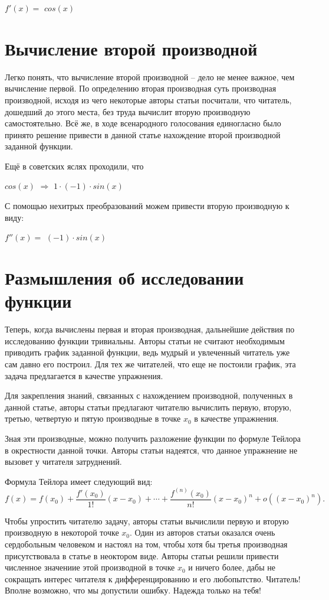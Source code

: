 \documentclass{article}
\begin{document}
$f'(x) = $ $ cos (x)$

\section{Вычисление второй производной}

Легко понять, что вычисление второй производной -- дело не менее важное, чем вычисление первой. По определению вторая производная суть производная производной, исходя из чего некоторые авторы статьи посчитали, что читатель, дошедший до этого места, без труда вычислит вторую производную самостоятельно. Всё же, в ходе всенародного голосования единогласно было принято решение привести в данной статье нахождение второй производной заданной функции.

Ещё в советских яслях проходили, что

$ cos (x)$ $\Rightarrow$ $1 \cdot (-1) \cdot  sin (x)$

С помощью нехитрых преобразований можем привести вторую производную к виду:

$f''(x) = $ $(-1) \cdot  sin (x)$\section{Размышления об исследовании функции}

Теперь, когда вычислены первая и вторая производная, дальнейшие действия по исследованию функции тривиальны. Авторы статьи не считают необходимым приводить график заданной функции, ведь мудрый и увлеченный читатель уже сам давно его построил. Для тех же читателей, что еще не постоили график, эта задача предлагается в качестве упражнения.

Для закрепления знаний, связанных с нахождением производной, полученных в данной статье, авторы статьи предлагают читателю вычислить первую, вторую, третью, четвертую и пятую производные в точке $x_0$ в качестве упражнения.

Зная эти производные, можно получить разложение функции по формуле Тейлора в окрестности данной точки. Авторы статьи надеятся, что данное упражнение не вызовет у читателя затруднений.

Формула Тейлора имеет следующий вид:
$$f(x) = f(x_0) + \frac{f'(x_0)}{1!}(x - x_0) + \cdots + \frac{f^{(n)}(x_0)}{n!}(x - x_0)^n + o((x - x_0)^n).$$

Чтобы упростить читателю задачу, авторы статьи вычислили первую и вторую производную в некоторой точке $x_0$. Один из авторов статьи оказался очень сердобольным человеком и настоял на том, чтобы хотя бы третья производная присутствовала в статье в неоктором виде. Авторы статьи решили привести численное значениие этой производной в точке $x_0$ и ничего более, дабы не сокращать интерес читателя к дифференцированию и его любопытство. Читатель! Вполне возможно, что мы допустили ошибку. Надежда только на тебя!
\end{document}
